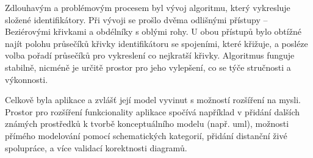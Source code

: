 Zdlouhavým a problémovým procesem byl vývoj algoritmu, který vykresluje složené identifikátory.
Při vývoji se prošlo dvěma odlišnými přístupy -- Beziérovými křivkami a obdélníky s oblými rohy.
U obou přístupů bylo obtížné najít polohu průsečíků křivky identifikátoru se spojeními, které křižuje, a posléze volba pořadí průsečíků pro vykreslení co nejkratší křivky.
Algoritmus funguje stabilně, nicméně je určitě prostor pro jeho vylepšení, co se týče stručnosti a výkonnosti.

Celkově byla aplikace a zvlášť její model vyvinut s možností rozšíření na mysli.
Prostor pro rozšíření funkcionality aplikace spočívá například v přidání dalších známých prostředků k tvorbě konceptuálního modelu (např. \acrshort{uml}), možnosti přímého modelování pomocí schematických kategorií, přidání distanční živé spolupráce, a více validací korektnosti diagramů.
